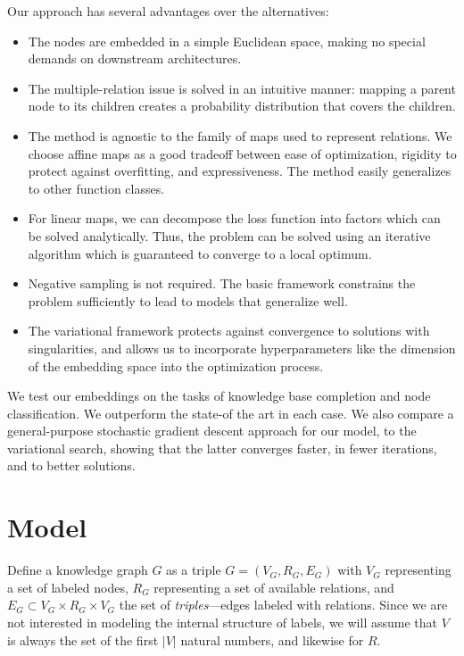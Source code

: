 \documentclass[11pt]{article}
\begin{document}
Our approach has several advantages over the alternatives:
\begin{itemize}
	\item The nodes are embedded in a simple Euclidean space, making no special demands on downstream architectures. %
	\item The multiple-relation issue is solved in an intuitive manner: mapping a parent node to its children creates a probability distribution that covers the children. 
	\item The method is agnostic to the family of maps used to represent relations. We choose affine maps as a good tradeoff between ease of optimization, rigidity to protect against overfitting, and expressiveness. The method easily generalizes to other function classes.
	\item For linear maps, we can decompose the loss function into factors which can be solved analytically. Thus, the problem can be solved using an iterative algorithm which is guaranteed to converge to a local optimum.
	\item Negative sampling is not required. The basic framework constrains the problem sufficiently to lead to models that generalize well.
	\item The variational framework protects against convergence to solutions with singularities, and allows us to incorporate hyperparameters like the dimension of the embedding space into the optimization process.
\end{itemize}

We test our embeddings on the tasks of knowledge base completion and node classification. We outperform the state-of the art in each case. We also compare a general-purpose stochastic gradient descent approach for our model, to the variational search, showing that the latter converges faster, in fewer iterations, and to better solutions.

\section{Model}
\label{section:model}

Define a knowledge graph $G$ as a triple $G = (V_G, R_G, E_G)$ with $V_G$ representing a set of labeled nodes, $R_G$ representing a set of available relations, and $E_G \subset V_G \times R_G \times V_G$ the set of \emph{triples}---edges labeled with relations. Since we are not interested in modeling the internal structure of labels, we will assume that $V$ is always the set of the first $|V|$ natural numbers, and likewise for $R$.
\end{document}
